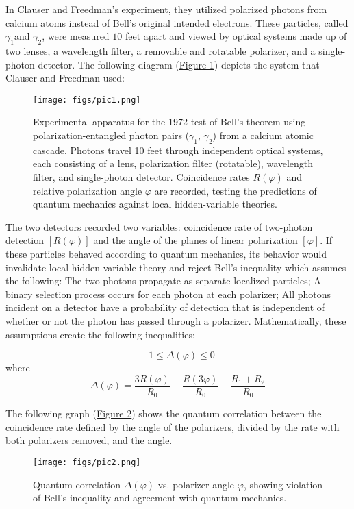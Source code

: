 \documentclass[a4paper, onecolumn, 11pt, titlepage]{quantumarticle}
\begin{document}
In Clauser and Freedman’s experiment, they utilized polarized photons from calcium atoms instead of Bell’s original intended electrons. These particles, called $\gamma_1$and $\gamma_2$, were measured $10$ feet apart and viewed by optical systems made up of two lenses, a wavelength filter, a removable and rotatable polarizer, and a single-photon detector. The following diagram (\hyperref[fig:system-diagram]{Figure 1}) depicts the system that Clauser and Freedman used: 

\begin{figure}
    \centering
    \texttt{[image: figs/pic1.png]}
    \caption{Experimental apparatus for the 1972 test of Bell’s theorem using polarization-entangled photon pairs ($\gamma_1$, $\gamma_2$) from a calcium atomic cascade. Photons travel 10 feet through independent optical systems, each consisting of a lens, polarization filter (rotatable), wavelength filter, and single-photon detector. Coincidence rates $R(\varphi)$ and relative polarization angle $\varphi$ are recorded, testing the predictions of quantum mechanics against local hidden-variable theories.}
    \label{fig:system-diagram}
\end{figure}

The two detectors recorded two variables: coincidence rate of two-photon detection $[R(\varphi)]$ and the angle of the planes of linear polarization $[\varphi]$. If these particles behaved according to quantum mechanics, its behavior would invalidate local hidden-variable theory and reject Bell’s inequality which assumes the following: The two photons propagate as separate localized particles; A binary selection process occurs for each photon at each polarizer; All photons incident on a detector have a probability of detection that is independent of whether or not the photon has passed through a polarizer. Mathematically, these assumptions create the following inequalities:

$$-1 \leq \Delta(\varphi) \leq 0$$
where
$$\Delta(\varphi) = \frac{3R(\varphi)}{R_0} - \frac{R(3\varphi)}{R_0} - \frac{R_1+R_2}{R_0}$$

The following graph (\hyperref[fig:angles-graph]{Figure 2}) shows the quantum correlation between the coincidence rate defined by the angle of the polarizers, divided by the rate with both polarizers removed, and the angle. 

\begin{figure}
    \centering
    \texttt{[image: figs/pic2.png]}
    \caption{Quantum correlation $\Delta(\varphi)$ vs. polarizer angle $\varphi$, showing violation of Bell’s inequality and agreement with quantum mechanics.}
    \label{fig:angles-graph}
\end{figure}
\end{document}
